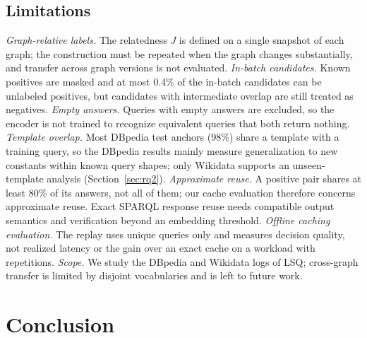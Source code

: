 \documentclass[runningheads]{llncs}
\begin{document}
\subsection{Limitations}
\label{sec:limitations}

\emph{Graph-relative labels.} The relatedness $J$ is defined on a single
snapshot of each graph; the construction must be repeated when the graph
changes substantially, and transfer across graph versions is not evaluated.
\emph{In-batch candidates.} Known positives are masked and at most 0.4\% of
the in-batch candidates can be unlabeled positives, but candidates with
intermediate overlap are still treated as negatives.
\emph{Empty answers.} Queries with empty answers are excluded, so the encoder
is not trained to recognize equivalent queries that both return nothing.
\emph{Template overlap.} Most DBpedia test anchors (98\%) share a template
with a training query, so the DBpedia results mainly measure generalization
to new constants within known query shapes; only Wikidata supports an
unseen-template analysis (Section~\ref{sec:rq2}).
\emph{Approximate reuse.} A positive pair shares at least $80\%$ of its
answers, not all of them; our cache evaluation therefore concerns approximate
reuse. Exact SPARQL response reuse needs compatible output semantics and
verification beyond an embedding threshold. \emph{Offline caching evaluation.} The replay uses
unique queries only and measures decision quality, not realized latency or the
gain over an exact cache on a workload with repetitions. \emph{Scope.} We study
the DBpedia and Wikidata logs of LSQ; cross-graph transfer is limited by
disjoint vocabularies and is left to future work.

\section{Conclusion}
\label{sec:conclusion}
\end{document}
